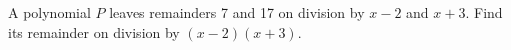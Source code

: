 A polynomial $P$ leaves remainders 7 and 17 on division by $x-2$ and $x+3$. Find its remainder on division by $(x-2)(x+3)$.
